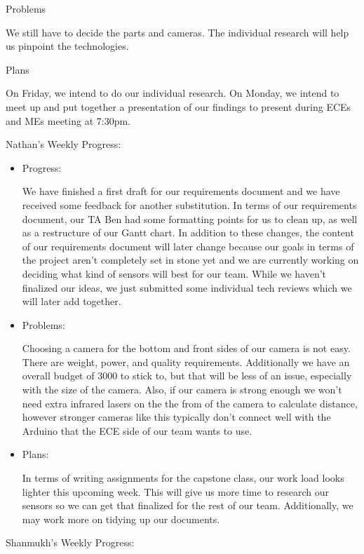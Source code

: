 \documentclass[onecolumn, oneside, letterpaper, draftclsnofoot, 10pt, compsoc]{IEEEtran}
\begin{document}
Problems

We still have to decide the parts and cameras. The individual research will help us pinpoint the technologies.

Plans

On Friday, we intend to do our individual research. On Monday, we intend to meet up and put together a presentation of our findings to present during ECEs and MEs meeting at 7:30pm.

Nathan's Weekly Progress:
\begin{itemize}
    \item Progress:

We have finished a first draft for our requirements document and we have received some feedback for another substitution. In terms of our requirements document, our TA Ben had some formatting points for us to clean up, as well as a restructure of our Gantt chart. In addition to these changes, the content of our requirements document will later change because our goals in terms of the project aren't completely set in stone yet and we are currently working on deciding what kind of sensors will best for our team. While we haven't finalized our ideas, we just submitted some individual tech reviews which we will later add together.
    \item Problems:

Choosing a camera for the bottom and front sides of our camera is not easy. There are weight, power, and quality requirements. Additionally we have an overall budget of 3000 to stick to, but that will be less of an issue, especially with the size of the camera. Also, if our camera is strong enough we won't need extra infrared lasers on the the from of the camera to calculate distance, however stronger cameras like this typically don't connect well with the Arduino that the ECE side of our team wants to use.
    \item Plans:

In terms of writing assignments for the capstone class, our work load looks lighter this upcoming week. This will give us more time to research our sensors so we can get that finalized for the rest of our team. Additionally, we may work more on tidying up our documents.
    \end{itemize}
Shanmukh's Weekly Progress:
\end{document}
